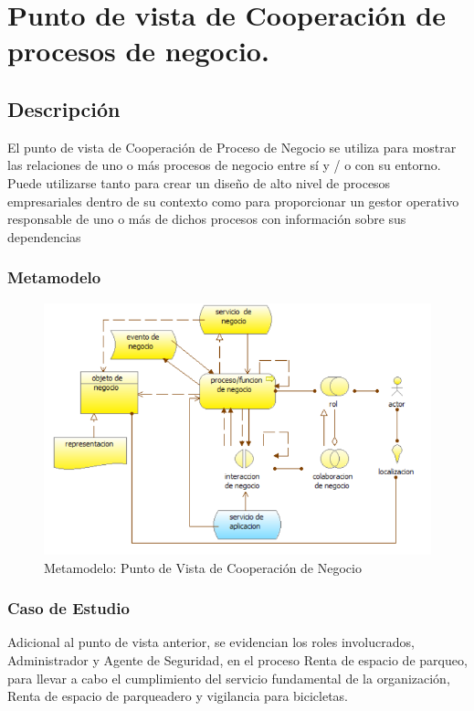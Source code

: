 \section{Punto de vista de Cooperación de procesos de negocio.}
\subsection{Descripción}
El punto de vista de Cooperación de Proceso de Negocio se utiliza para mostrar las relaciones de
uno o más procesos de negocio entre sí y / o con su entorno. Puede utilizarse tanto para crear un diseño
de alto nivel de procesos empresariales dentro de su contexto como para proporcionar un gestor
operativo responsable de uno o más de dichos procesos con información sobre sus dependencias

\subsubsection{Metamodelo}
\begin{figure}[H]
	\centering
	\includegraphics[width=1.0\textwidth]{imagenes/Metamodelos/Negocio/meta_cooperacion_proceso_negocio.png}
	\caption{Metamodelo: Punto de Vista de Cooperación de Negocio}
	\label{fig:gap_analysis}
\end{figure}



\subsubsection{Caso de Estudio}
Adicional al punto de vista anterior, se evidencian los roles involucrados, Administrador y Agente de Seguridad, en el proceso Renta de espacio de parqueo, para llevar a cabo el cumplimiento del servicio fundamental de la organización, Renta de espacio de parqueadero y vigilancia para bicicletas.

